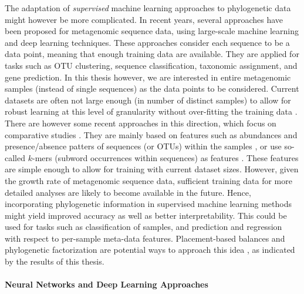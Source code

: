 The adaptation of \emph{supervised} machine learning approaches to phylogenetic data might however be more complicated.
In recent years, several approaches have been proposed for metagenomic sequence data,
using large-scale machine learning \cite{Vervier2015,Soueidan2015}
and deep learning \cite{Angermueller2016,Fiannaca2018} techniques.
These approaches consider each sequence to be a data point, meaning that enough training data are available.
They are applied for tasks such as OTU clustering, sequence classification, taxonomic assignment, and gene prediction.
In this thesis however, we are interested in entire metagenomic samples (instead of single sequences)
as the data points to be considered.
Current datasets are often not large enough (in number of distinct samples)
to allow for robust learning at this level of granularity without over-fitting the training data \cite{Angermueller2016}.
There are however some recent approaches in this direction, which focus on comparative studies \cite{Soueidan2015}.
They are mainly based on features such as
abundances and presence/absence patters of sequences (or \acsp{OTU}) within the samples \cite{Pasolli2016},
or use so-called $k$-mers (subword occurrences within sequences) as features \cite{Asgari2015}.
These features are simple enough to allow for training with current dataset sizes.
However, given the growth rate of metagenomic sequence data,
sufficient training data for more detailed analyses are likely to become available in the future.
Hence, incorporating phylogenetic information in supervised machine learning methods might yield
improved accuracy as well as better interpretability.
This could be used for tasks such as classification of samples,
and prediction and regression with respect to per-sample meta-data features.
Placement-based balances and phylogenetic factorization
are potential ways to approach this idea \cite{Silverman2017,Washburne2017a},
as indicated by the results of this thesis.

\paragraph{Neural Networks and Deep Learning Approaches}
\label{ch:ConclusionOutlook:sec:AnalysisMethods:par:DeepLearningApproaches}

